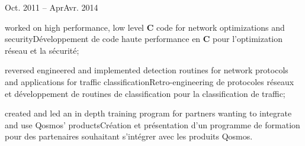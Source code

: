 \documentclass[a4paper]{article}
\newcommand\enfr[2]{\ifdefined\doen#1\else#2\fi\xspace}
\newcommand\clang{\textbf{C}\xspace}
\newcommand\timespan[2]{\normalsize\textsf{#1 -- #2}}
\begin{document}
\begin{minipage}[t]{0.63\textwidth}
\vspace{0.5em}
\timespan{Oct. 2011}{\enfr{Apr}{Avr}. 2014}
\begin{compactitem}
\item[\textbullet] \enfr{worked on high performance, low level \clang
  code for network optimizations and security}
  {Développement de code haute performance en \clang pour
    l'optimization réseau et la sécurité};
\item[\textbullet] \enfr{reversed engineered and implemented detection
  routines for network protocols and applications for traffic
  classification}
  {Retro-engineering de protocoles réseaux et développement de routines
    de classification pour la classification de traffic};
\item[\textbullet] \enfr{created and led an in depth training program for partners wanting to
  integrate and use Qosmos' products}
  {Création et présentation d'un programme de formation pour des
    partenaires souhaitant s'intégrer avec les produits Qosmos}.
\end{compactitem}
\end{minipage}
\hfill
\end{document}
